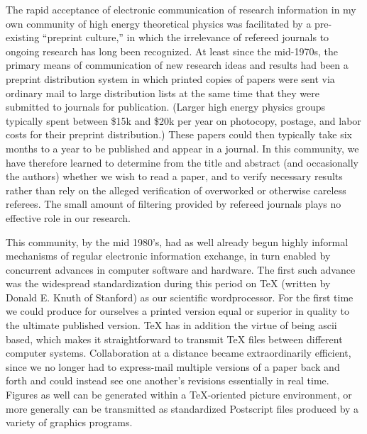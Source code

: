 \medskip{}

The rapid acceptance of electronic communication of research information in
my own community of high energy theoretical physics
was facilitated by a pre-existing ``preprint culture,''
in which the irrelevance of refereed journals to
ongoing research has long been recognized. At least since the mid-1970s, the
primary means of communication of new research ideas and results had been a
preprint distribution system in which printed copies of papers were sent
via ordinary mail to large distribution lists at the same time that they were
submitted to journals for publication. (Larger high energy physics groups
typically spent between \$15k and \$20k per year on photocopy, postage, and
labor costs for their preprint distribution.) These papers could then typically
take six months to a year to be published and appear in a journal. In this
community, we have therefore learned to determine from the title and abstract
(and occasionally the authors) whether we wish to read a paper, and to verify
necessary results rather than rely on the alleged verification of overworked or
otherwise careless referees. The small amount of filtering provided by refereed
journals plays no effective role in our research.

This community, by the mid 1980's, had as well already begun highly informal
mechanisms of regular electronic information exchange, in turn enabled by
concurrent advances in computer software and hardware. The first such advance
was the widespread standardization during this period on TeX (written by Donald
E. Knuth of Stanford) as our scientific wordprocessor. For the first time we
could produce for ourselves a printed version equal or superior in quality to
the ultimate published version. TeX has in addition the virtue of being ascii
based, which makes it straightforward to transmit TeX files between different
computer systems. Collaboration at a distance became extraordinarily efficient,
since we no longer had to express-mail multiple versions of a paper back and
forth and could instead see one another's revisions essentially in real time.
Figures as well can be generated within a TeX-oriented picture environment, or
more generally can be transmitted as standardized Postscript files produced by
a variety of graphics programs.

